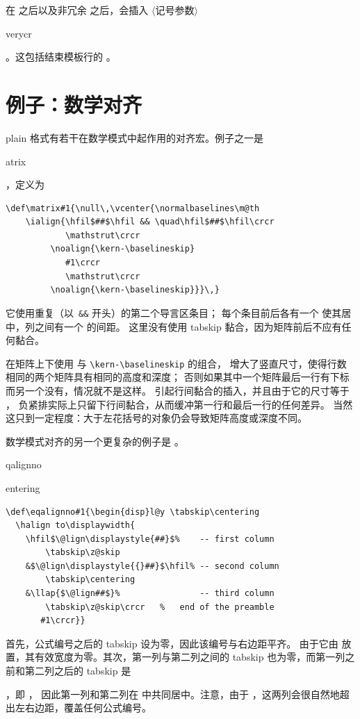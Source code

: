 \documentclass[a4paper]{rapport3}
\makeatletter
\def\gr#1{$\langle$#1$\rangle$}\def\key#1{{\tt#1}}
\def\alt{}\def\altt{}%
\newenvironment{disp}{\begin{quotation}}{\end{quotation}}
\def\cstoidx#1\par{\index{#1@\cs{#1}}}
\def\csidx#1{\cstoidx #1\par\cs{#1}}
\makeatother
\begin{document}
在  之后以及非冗余  之后，会插入
\gr{记号参数} \csidx{everycr}。这包括结束模板行的 。

\section{例子：数学对齐}

plain 格式有若干在数学模式中起作用的对齐宏。例子之一是 \csidx{matrix}，定义为
\begin{verbatim}
\def\matrix#1{\null\,\vcenter{\normalbaselines\m@th
    \ialign{\hfil$##$\hfil && \quad\hfil$##$\hfil\crcr
            \mathstrut\crcr
         \noalign{\kern-\baselineskip}
            #1\crcr
            \mathstrut\crcr
         \noalign{\kern-\baselineskip}}}\,}
\end{verbatim}
它使用重复（以~\verb>&&> 开头）的第二个导言区条目；
每个条目前后各有一个  使其居中，列之间有一个  的间距。
这里没有使用 tabskip 黏合，因为矩阵前后不应有任何黏合。

在矩阵上下使用  与 \verb>\kern-\baselineskip> 的组合，
增大了竖直尺寸，使得行数相同的两个矩阵具有相同的高度和深度；
否则如果其中一个矩阵最后一行有下标而另一个没有，情况就不是这样。
 引起行间黏合的插入，并且由于它的尺寸等于 ，
负紧排实际上只留下行间黏合，从而缓冲第一行和最后一行的任何差异。
当然这只到一定程度：大于左花括号的对象仍会导致矩阵高度或深度不同。

数学模式对齐的另一个更复杂的例子是 。
\cstoidx eqalignno\par\cstoidx centering\par
\begin{verbatim}
\def\eqalignno#1{\begin{disp}l@y \tabskip\centering
  \halign to\displaywidth{
    \hfil$\@lign\displaystyle{##}$%    -- first column
        \tabskip\z@skip
    &$\@lign\displaystyle{{}##}$\hfil% -- second column
        \tabskip\centering
    &\llap{$\@lign##$}%                -- third column
        \tabskip\z@skip\crcr   %   end of the preamble
       #1\crcr}}
\end{verbatim}
首先，公式编号之后的 tabskip 设为零，因此该编号与右边距平齐。
由于它由  放置，其有效宽度为零。其次，第一列与第二列之间的
tabskip 也为零，而第一列之前和第二列之后的 tabskip 是
\alt
{}，即 ，
因此第一列和第二列在  中共同居中。注意，由于
，这两列会很自然地超出左右边距，覆盖任何公式编号。
\end{document}
